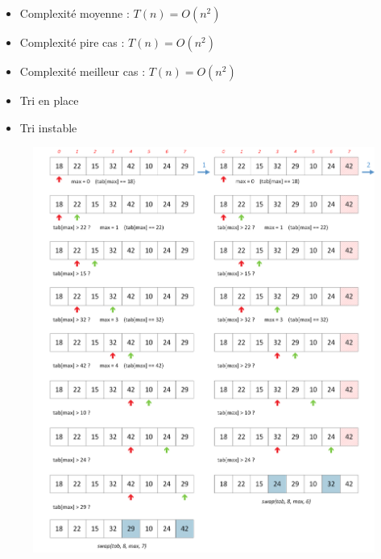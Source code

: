 \documentclass[11pt,a4paper]{article}
\begin{document}
\medskip

\begin{itemize}
\item Complexité moyenne : $ T(n) = O(n^{2}) $
\item Complexité pire cas : $ T(n) = O(n^{2}) $
\item Complexité meilleur cas : $ T(n) = O(n^{2}) $
\item Tri en place
\item Tri instable
\end{itemize}


\clearpage


\vfillFirst

\begin{figure}[ht!]
\centering
\centerline{
\includegraphics[width=1.2\textwidth]{img/tris/2_per_pages/SelectionSort_part1.png}
}
\end{figure}
\end{document}
